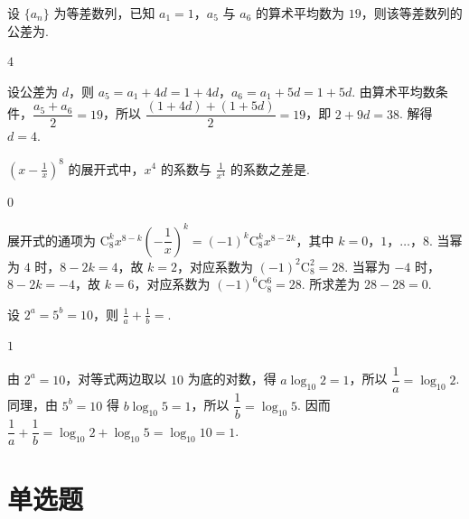\begin{problem}
设 \(\{a_n\}\) 为等差数列，已知 \(a_1=1\)，\(a_5\) 与 \(a_6\) 的算术平均数为 \(19\)，则该等差数列的公差为\fillinblank{}.
\end{problem}

\begin{answer}
\(4\)
\end{answer}

\begin{solution}
设公差为 \(d\)，则 \(a_5=a_1+4d=1+4d\)，\(a_6=a_1+5d=1+5d\). 由算术平均数条件，\(\dfrac{a_5+a_6}{2}=19\)，所以
\(\dfrac{(1+4d)+(1+5d)}{2}=19\)，即 \(2+9d=38\). 解得 \(d=4\).
\end{solution}

\begin{problem}
\(\left(x-\frac{1}{x}\right)^8\) 的展开式中，\(x^4\) 的系数与 \(\frac{1}{x^4}\) 的系数之差是\fillinblank{}.
\end{problem}

\begin{answer}
\(0\)
\end{answer}

\begin{solution}
展开式的通项为 \(\mathrm C_8^k x^{8-k}\left(-\dfrac1x\right)^k=(-1)^k\mathrm C_8^k x^{8-2k}\)，其中 \(k=0\)，\(1\)，\(\dots\)，\(8\). 当幂为 \(4\) 时，\(8-2k=4\)，故 \(k=2\)，对应系数为 \((-1)^2\mathrm C_8^2=28\). 当幂为 \(-4\) 时，\(8-2k=-4\)，故 \(k=6\)，对应系数为 \((-1)^6\mathrm C_8^6=28\). 所求差为 \(28-28=0\).
\end{solution}

\begin{problem}
设 \(2^a=5^b=10\)，则 \(\frac{1}{a}+\frac{1}{b}=\)\fillinblank{}.
\end{problem}

\begin{answer}
\(1\)
\end{answer}

\begin{solution}
由 \(2^a=10\)，对等式两边取以 \(10\) 为底的对数，得 \(a\log_{10}2=1\)，所以 \(\dfrac1a=\log_{10}2\). 同理，由 \(5^b=10\) 得 \(b\log_{10}5=1\)，所以 \(\dfrac1b=\log_{10}5\). 因而
\(\dfrac1a+\dfrac1b=\log_{10}2+\log_{10}5=\log_{10}10=1\).
\end{solution}

\section{单选题}

